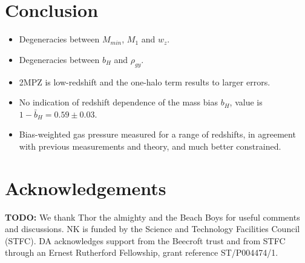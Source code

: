 \documentclass[useAMS,usenatbib]{mn2e}
\newcommand{\todo}[1]{{\bf TODO:} #1}
\begin{document}
      



\section{Conclusion}\label{sec:conclusion}
  \begin{itemize}
      \item Degeneracies between $M_{min}$, $M_1$ and $w_z$.
      \item Degeneracies between $b_H$ and $\rho_{gy}$.
      \item 2MPZ is low-redshift and the one-halo term results to larger errors.
      \item No indication of redshift dependence of the mass bias $b_H$, value is $1-\bar{b}_H=0.59\pm0.03$.
      \item Bias-weighted gas pressure measured for a range of redshifts, in agreement with previous measurements and theory, and much better constrained.
  \end{itemize}

\section*{Acknowledgements}
  \todo{We thank Thor the almighty and the Beach Boys for useful comments and discussions.} NK is funded by the Science and Technology Facilities Council (STFC). DA acknowledges support from the Beecroft trust and from STFC through an Ernest Rutherford Fellowship, grant reference ST/P004474/1.
  
\setlength{\bibhang}{2.0em}
\setlength{}


\appendix
\end{document}
